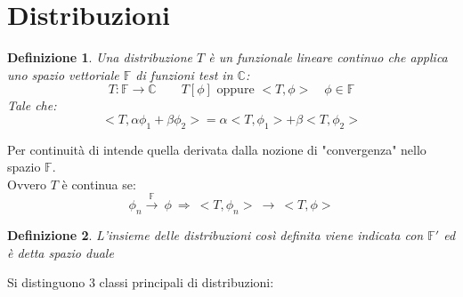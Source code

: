 \documentclass[twoside]{article}
\newtheorem{definition}{Definizione}[section]
\begin{document}
\newpage
\section{Distribuzioni}
\begin{definition}
Una distribuzione $T$ è un funzionale lineare continuo che applica uno spazio vettoriale $\mathds{F}$ di funzioni test in $\mathds{C}$:
\begin{equation}
    T:\mathds{F}\to \mathds{C} \qquad T[\phi] \text{ oppure } <T,\phi> \quad \phi \in \mathds{F}
\end{equation}
Tale che:
\begin{equation}
    <T,\alpha\phi_1+\beta\phi_2>=\alpha<T,\phi_1>+\beta<T,\phi_2>
\end{equation}
\end{definition}
Per continuità di intende quella derivata dalla nozione di "convergenza" nello spazio $\mathds{F}$.\\
Ovvero $T$ è continua se:
\begin{equation}
    \phi_n\xrightarrow{\mathds{F}} \ \phi \ \Longrightarrow \ <T,\phi_n> \ \to \ <T,\phi>
\end{equation}
\begin{definition}
L'insieme delle distribuzioni così definita viene indicata con $\mathds{F}'$ ed è detta spazio duale
\end{definition}
Si distinguono 3 classi principali di distribuzioni:
\end{document}
